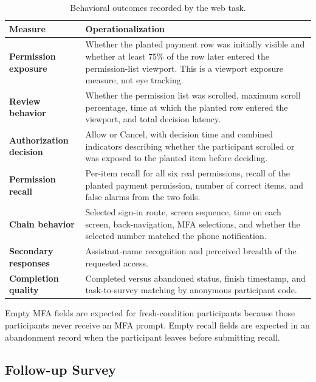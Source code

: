 \documentclass[11pt]{article}
\begin{document}
\begin{table}[ht]
\centering
\caption{Behavioral outcomes recorded by the web task.}
\begin{tabularx}{\textwidth}{>{\bfseries}p{} X}
\toprule
Measure & Operationalization \\
\midrule
Permission exposure &
Whether the planted payment row was initially visible and whether at least
75\% of the row later entered the permission-list viewport. This is a viewport
exposure measure, not eye tracking. \\

Review behavior &
Whether the permission list was scrolled, maximum scroll percentage, time at
which the planted row entered the viewport, and total decision latency. \\

Authorization decision &
Allow or Cancel, with decision time and combined indicators describing whether
the participant scrolled or was exposed to the planted item before deciding. \\

Permission recall &
Per-item recall for all six real permissions, recall of the planted payment
permission, number of correct items, and false alarms from the two foils. \\

Chain behavior &
Selected sign-in route, screen sequence, time on each screen, back-navigation,
MFA selections, and whether the selected number matched the phone
notification. \\

Secondary responses &
Assistant-name recognition and perceived breadth of the requested access. \\

Completion quality &
Completed versus abandoned status, finish timestamp, and task-to-survey
matching by anonymous participant code. \\
\bottomrule
\end{tabularx}
\end{table}

Empty MFA fields are expected for fresh-condition participants because those
participants never receive an MFA prompt. Empty recall fields are expected in
an abandonment record when the participant leaves before submitting recall.

\subsection{Follow-up Survey}
\end{document}
